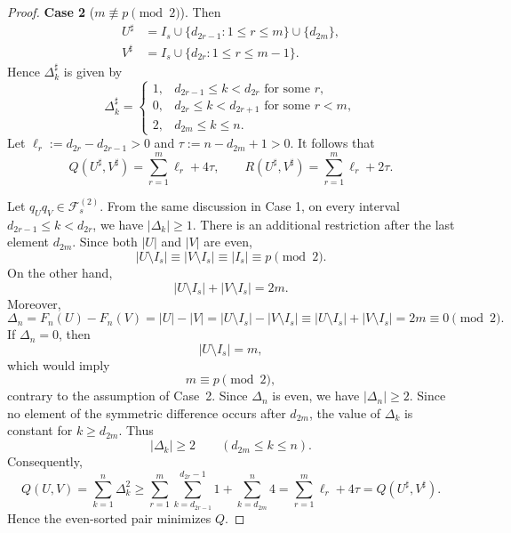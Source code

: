 \documentclass[11pt]{amsart}
\theoremstyle{definition}
\numberwithin{equation}{section}
\begin{document}
\begin{proof}
\medskip

\noindent
{\bf Case 2} (\(m\not\equiv p\pmod2\)). 
Then
\begin{align*}
U^\sharp
&=I_s\cup\{d_{2r-1}:1\le r\le m\}\cup\{d_{2m}\},\\
V^\sharp
&=I_s\cup\{d_{2r}:1\le r\le m-1\}.
\end{align*}
Hence $\Delta_k^\sharp$
is given by
\[
 \Delta_k^\sharp=
 \begin{cases}
1, & d_{2r-1}\le k<d_{2r}
    \text{ for some }r,\\
0, & d_{2r}\le k<d_{2r+1}
    \text{ for some }r<m,\\
2, & d_{2m}\le k\le n.
 \end{cases}
\]
Let $\ell_r:=d_{2r}-d_{2r-1}>0$ and $\tau:=n-d_{2m}+1>0$. It follows that
\[
Q(U^\sharp,V^\sharp) =
 \sum_{r=1}^m\ell_r+4\tau,
 \qquad
R(U^\sharp,V^\sharp) =
 \sum_{r=1}^m\ell_r+2\tau.
\]

Let $q_Uq_V\in\mathcal{F}^{(2)}_s$.
From the same discussion in Case 1,
on every interval
$d_{2r-1}\le k<d_{2r}$,
we have $|\Delta_k|\ge1$.
There is an additional restriction after the last element
\(d_{2m}\).  Since both \(|U|\) and \(|V|\) are even,
\[
|U\setminus I_s|\equiv |V\setminus I_s|
 \equiv |I_s|
 \equiv p
 \pmod2.
\]
On the other hand,
\[
|U\setminus I_s|+|V\setminus I_s|=2m.
\]
Moreover,
\[
 \Delta_n
=
F_n(U) - F_n(V)
= |U|-|V| 
= |U \setminus I_s|-|V \setminus I_s| 
\equiv |U \setminus I_s|+|V \setminus I_s| 
=2m
\equiv0
\pmod 2.
\]
If \(\Delta_n=0\), then
\[
|U\setminus I_s|=m,
\]
which would imply
\[
m\equiv p\pmod2,
\]
contrary to the assumption of Case~2. 
Since $\Delta_n$ is even,
we have $|\Delta_n|\ge2$.
Since no element of the symmetric difference occurs after \(d_{2m}\), the value of \(\Delta_k\) is constant for \(k\ge d_{2m}\). Thus
\[
|\Delta_k|\ge2
 \qquad(d_{2m}\le k\le n).
\]
Consequently,
\[
Q(U,V) =
 \sum_{k=1}^n\Delta_k^2
\ge
 \sum_{r=1}^m
 \sum_{k=d_{2r-1}}^{d_{2r}-1}1
+
 \sum_{k=d_{2m}}^n4
=
 \sum_{r=1}^m\ell_r+4\tau
= Q(U^\sharp,V^\sharp).
\]
Hence the even-sorted pair minimizes $Q$.


\end{proof}
\end{document}
